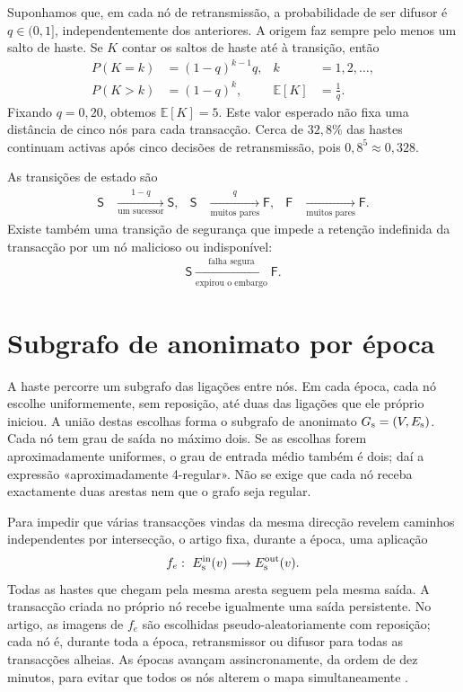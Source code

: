 Suponhamos que, em cada nó de retransmissão, a probabilidade de ser difusor é
\(q\in(0,1]\), independentemente dos anteriores. A origem faz sempre pelo menos um
salto de haste. Se \(K\) contar os saltos de haste até à transição, então
\begin{align}
 P(K=k)&=(1-q)^{k-1}q, & k&=1,2,\ldots,
 \label{eq:dandelion-geometric}\\
 P(K>k)&=(1-q)^k, & \mathbb E[K]&=\frac1q.\nonumber
\end{align}
Fixando \(q=0{,}20\), obtemos
\(\mathbb E[K]=5\). Este valor esperado não fixa uma distância de cinco nós
para cada transacção. Cerca de \(32{,}8\%\) das hastes continuam activas após
cinco decisões de retransmissão, pois
\(0{,}8^5\approx0{,}328\).

As transições de estado são
\begin{align}
 \mathsf S
 &\xrightarrow[\text{um sucessor}]{1-q}\mathsf S,
 &
 \mathsf S
 &\xrightarrow[\text{muitos pares}]{q}\mathsf F,
 &
 \mathsf F
 &\xrightarrow[\text{muitos pares}]{}\mathsf F.
 \label{eq:dandelion-state-transition}
\end{align}
Existe também uma transição de segurança que impede a retenção indefinida da
transacção por um nó malicioso ou indisponível:
\begin{align}
 \mathsf S\xrightarrow[\text{expirou o embargo}]{\text{falha segura}}
 \mathsf F.
 \label{eq:dandelion-failsafe-transition}
\end{align}


\section{Subgrafo de anonimato por época}
\label{sec:dandelion-stem-graph}

A haste percorre um subgrafo das ligações entre nós. Em cada época,
cada nó escolhe uniformemente, sem reposição, até duas das ligações que ele
próprio iniciou. A união destas escolhas forma o subgrafo de anonimato
\(G_{\rm s}=(V,E_{\rm s})\). Cada nó tem grau de saída no máximo dois. Se as
escolhas forem aproximadamente uniformes, o grau de entrada médio também é
dois; daí a expressão «aproximadamente 4-regular». Não se exige que cada nó
receba exactamente duas arestas nem que o grafo seja regular.

Para impedir que várias transacções vindas da mesma direcção revelem caminhos
independentes por intersecção, o artigo fixa, durante a época, uma aplicação
\begin{align}
 f_e:\ E^{\rm in}_{\rm s}(v)\longrightarrow E^{\rm out}_{\rm s}(v).
 \label{eq:dandelion-in-out-map}
\end{align}
Todas as hastes que chegam pela mesma aresta seguem pela mesma saída. A
transacção criada no próprio nó recebe igualmente uma saída persistente. No
artigo, as imagens de \(f_e\) são escolhidas pseudo-aleatoriamente com
reposição; cada nó é, durante toda a época, retransmissor ou difusor para todas
as transacções alheias. As épocas avançam assincronamente, da ordem de dez
minutos, para evitar que todos os nós alterem o mapa simultaneamente
\cite{dandelion-plus-plus}.

